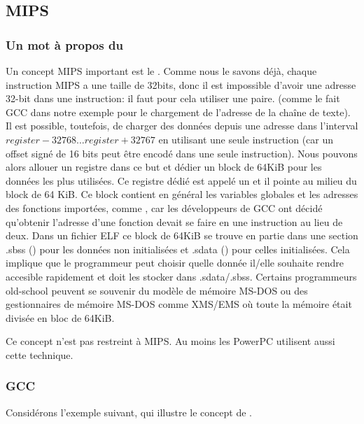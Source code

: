 \subsection{MIPS}

\subsubsection{Un mot à propos du }
\label{MIPS_GP}


Un concept MIPS important est le .
Comme nous le savons déjà, chaque instruction MIPS a une taille de 32bits, donc
il est impossible d'avoir une adresse 32-bit dans une instruction: il faut pour
cela utiliser une paire.
(comme le fait GCC dans notre exemple pour le chargement de l'adresse de la chaîne
de texte).
Il est possible, toutefois, de charger des données depuis une adresse dans l'interval
$register-32768...register+32767$ en utilisant une seule instruction (car un offset
signé de 16 bits peut être encodé dans une seule instruction).
Nous pouvons alors allouer un registre dans ce but et dédier un block de 64KiB
pour les données les plus utilisées.
Ce registre dédié est appelé un  et il pointe au milieu du
block de 64 KiB.
Ce block contient en général les variables globales et les adresses des fonctions
importées, comme \printf, car les développeurs de GCC ont décidé qu'obtenir
l'adresse d'une fonction devait se faire en une instruction au lieu de deux.
Dans un fichier ELF ce block de 64KiB se trouve en partie dans une section .sbss
() pour les données non initialisées et .sdata ()
pour celles initialisées.
Cela implique que le programmeur peut choisir quelle donnée il/elle souhaite rendre
accesible rapidement et doit les stocker dans .sdata/.sbss.
Certains programmeurs old-school peuvent se souvenir du modèle de mémoire MS-DOS
 ou des gestionnaires de mémoire MS-DOS comme XMS/EMS
où toute la mémoire était divisée en bloc de 64KiB.


Ce concept n'est pas restreint à MIPS. Au moins les PowerPC utilisent aussi cette
technique.

\subsubsection{GCC \Optimizing}

Considérons l'exemple suivant, qui illustre le concept de .

